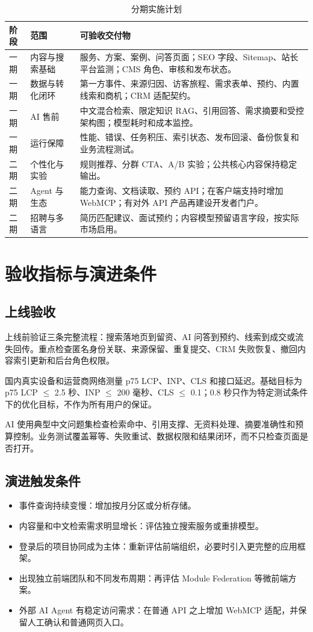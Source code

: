 \documentclass[UTF8,zihao=-4,a4paper]{ctexart}
\begin{document}
\begin{longtable}{P{17mm}P{38mm}Y}
\caption{分期实施计划}\\
\toprule
\textbf{阶段} & \textbf{范围} & \textbf{可验收交付物}\\
\midrule
一期 & 内容与搜索基础 & 服务、方案、案例、问答页面；SEO 字段、Sitemap、站长平台监测；CMS 角色、审核和发布状态。\\
一期 & 数据与转化闭环 & 第一方事件、来源归因、访客旅程、需求表单、预约、内置线索和商机；CRM 适配契约。\\
一期 & AI 售前 & 中文混合检索、限定知识 RAG、引用回答、需求摘要和受控架构图；模型耗时和成本监控。\\
一期 & 运行保障 & 性能、错误、任务积压、索引状态、发布回滚、备份恢复和业务流程测试。\\
二期 & 个性化与实验 & 规则推荐、分群 CTA、A/B 实验；公共核心内容保持稳定输出。\\
二期 & Agent 与生态 & 能力查询、文档读取、预约 API；在客户端支持时增加 WebMCP；有对外 API 产品再建设开发者门户。\\
二期 & 招聘与多语言 & 简历匹配建议、面试预约；内容模型预留语言字段，按实际市场启用。\\
\bottomrule
\end{longtable}

\section{验收指标与演进条件}

\subsection{上线验收}
上线前验证三条完整流程：搜索落地页到留资、AI 问答到预约、线索到成交或流失回传。重点检查匿名身份关联、来源保留、重复提交、CRM 失败恢复、撤回内容索引更新和后台角色权限。

国内真实设备和运营商网络测量 p75 LCP、INP、CLS 和接口延迟。基础目标为 p75 LCP $\leq$ 2.5 秒、INP $\leq$ 200 毫秒、CLS $\leq$ 0.1；0.8 秒只作为特定测试条件下的优化目标，不作为所有用户的保证。

AI 使用典型中文问题集检查检索命中、引用支撑、无资料处理、摘要准确性和预算控制。业务测试覆盖幂等、失败重试、数据权限和结果闭环，而不只检查页面是否打开。

\subsection{演进触发条件}
\begin{itemize}
  \item 事件查询持续变慢：增加按月分区或分析存储。
  \item 内容量和中文检索需求明显增长：评估独立搜索服务或重排模型。
  \item 登录后的项目协同成为主体：重新评估前端组织，必要时引入更完整的应用框架。
  \item 出现独立前端团队和不同发布周期：再评估 Module Federation 等微前端方案。
  \item 外部 AI Agent 有稳定访问需求：在普通 API 之上增加 WebMCP 适配，并保留人工确认和普通网页入口。
\end{itemize}
\end{document}
